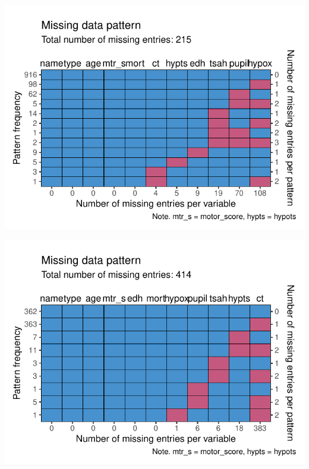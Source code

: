 \documentclass[
]{jss}
\begin{document}
\begin{CodeChunk}


\begin{center}\includegraphics{Imputation_of_Incomplete_Multilevel_Data_files/figure-latex/impact_md-1} \end{center}



\begin{center}\includegraphics{Imputation_of_Incomplete_Multilevel_Data_files/figure-latex/impact_md-2} \end{center}

\end{CodeChunk}
\end{document}
